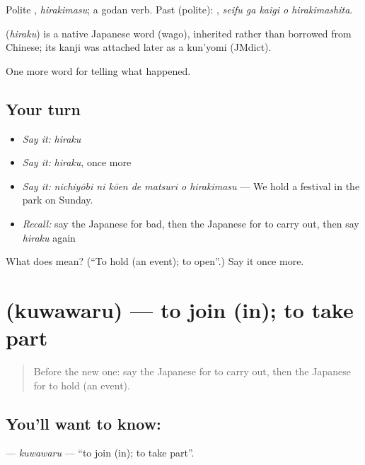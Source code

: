 Polite \textbf{}, \emph{hirakimasu}; a godan verb. Past (polite): \textbf{  }, \emph{seifu ga kaigi o hirakimashita}.

\begin{cousinweb}
\textbf{} (\emph{hiraku}) is a native Japanese word (wago), inherited rather than borrowed from Chinese; its kanji was attached later as a kun'yomi (JMdict).
\end{cousinweb}

\begin{grammarlens}[title={What you've built}]
One more word for telling what happened.
\end{grammarlens}

\subsection*{Your turn}
\begin{itemize}
\raggedright
  \item \emph{Say it:} \emph{hiraku}
  \item \emph{Say it:} \emph{hiraku}, once more
  \item \emph{Say it:} \emph{nichiyōbi ni kōen de matsuri o hirakimasu} — We hold a festival in the park on Sunday.
  \item \emph{Recall:} say the Japanese for bad, then the Japanese for to carry out, then say \emph{hiraku} again
\end{itemize}

\begin{tcolorbox}[breakable,colback=teal!4,colframe=teal!35!black,title={Before you move on}]
What does  mean? (\textquotedblleft{}To hold (an event); to open\textquotedblright{}.) Say it once more.
\end{tcolorbox}
\section[\texorpdfstring{\ja{くわわる} (kuwawaru)}{くわわる (kuwawaru)}]{ (kuwawaru) — to join (in); to take part}

\label{lesson:JA-C285-kuwawaru}



\begin{quote}
Before the new one: say the Japanese for to carry out, then the Japanese for to hold (an event).
\end{quote}

\subsection*{You'll want to know: }
\textbf{} — \emph{kuwawaru} — \textquotedblleft{}to join (in); to take part\textquotedblright{}.


